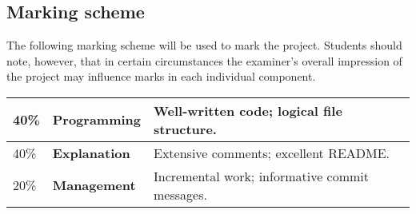 \documentclass[12pt, a4paper]{article}
\begin{document}
\subsection*{Marking scheme}
The following marking scheme will be used to mark the project.
Students should note, however, that in certain circumstances the examiner's overall impression of the project may influence marks in each individual component.

\begin{center}
\begin{tabular}{lll}
\toprule
40\% & \textbf{Programming} & Well-written code; logical file structure.\\
\midrule
40\% & \textbf{Explanation} & Extensive comments; excellent README. \\
\midrule
20\% & \textbf{Management} & Incremental work; informative commit messages. \\
\bottomrule
\end{tabular}
\end{center}
\end{document}
